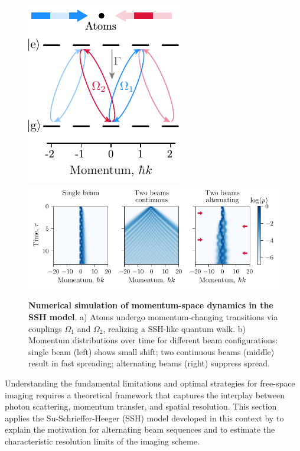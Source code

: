 
\begin{figure}
    \centering
    \includegraphics{fig-ai/ssh-scheme.pdf}
    \hfill
    \includegraphics{fig-py/ssh-model.pdf}
    \caption[Numerical simulation of momentum-space dynamics in the SSH model]{
        \textbf{Numerical simulation of momentum-space dynamics in the SSH model}. 
        a) Atoms undergo momentum-changing transitions via couplings $\Omega_1$ and $\Omega_2$, realizing a SSH-like quantum walk.
        b) Momentum distributions over time for different beam configurations: single beam (left) shows small shift; two continuous beams (middle) result in fast spreading; alternating beams (right) suppress spread.
    }
    \label{fig:sshmodel}
\end{figure}

Understanding the fundamental limitations and optimal strategies for free-space imaging requires a theoretical framework that captures the interplay between photon scattering, momentum transfer, and spatial resolution. This section applies the Su-Schrieffer-Heeger (SSH) model developed in this context by \cite{su_fast_2025} to explain the motivation for alternating beam sequences and to estimate the characteristic resolution limits of the imaging scheme.

